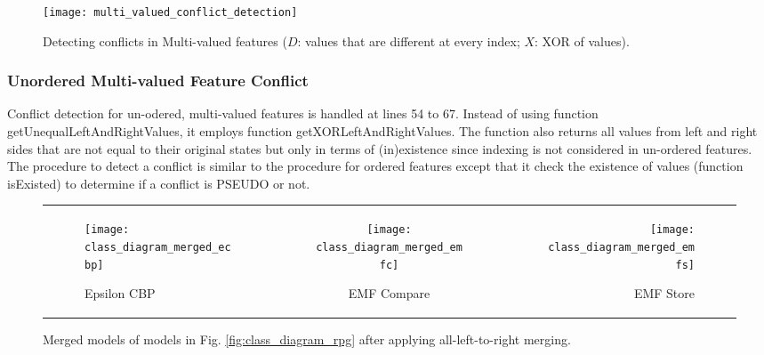 \begin{figure}
    \texttt{[image: multi\_valued\_conflict\_detection]}
    \caption{Detecting conflicts in Multi-valued features ($D$: values that are different at every index; $X$: XOR of values).}
    \label{fig:multi_valued_conflict_detection}
\end{figure}

\subsubsection{Unordered Multi-valued Feature Conflict} 
\label{sec:unordered_conflict}
Conflict detection for un-odered, multi-valued features is handled at lines 54 to 67. Instead of using function \textsf{getUnequalLeftAndRightValues}, it employs function \textsf{getXORLeftAndRightValues}. The function also returns all values from left and right sides that are not equal to their original states but only in terms of (in)existence since indexing is not considered in un-ordered features. The procedure to detect a conflict is similar to the procedure for ordered features except that it check the existence of values (function \textsf{isExisted}) to determine if a conflict is \textsf{PSEUDO} or not.

\begin{figure*}
    \begin{tabular}{l|c|r}
        \begin{subfigure}[t]{0.31\linewidth}
            \texttt{[image: class\_diagram\_merged\_ecbp]}
            \caption{Epsilon CBP}
            \label{fig:class_diagram_merged_ecbp}
        \end{subfigure}
        &
        \begin{subfigure}[t]{0.31\linewidth}
            \texttt{[image: class\_diagram\_merged\_emfc]}
            \caption{EMF Compare}
            \label{fig:class_diagram_merged_emfc}
        \end{subfigure}
        &
        \begin{subfigure}[t]{0.31\linewidth}
            \texttt{[image: class\_diagram\_merged\_emfs]}
            \caption{EMF Store}
            \label{fig:class_diagram_merged_emfs}
        \end{subfigure}
    \end{tabular}
    \caption{Merged models of models in Fig. \ref{fig:class_diagram_rpg} after applying all-left-to-right merging.}
    \label{fig:class_diagram_merged}
\end{figure*}

